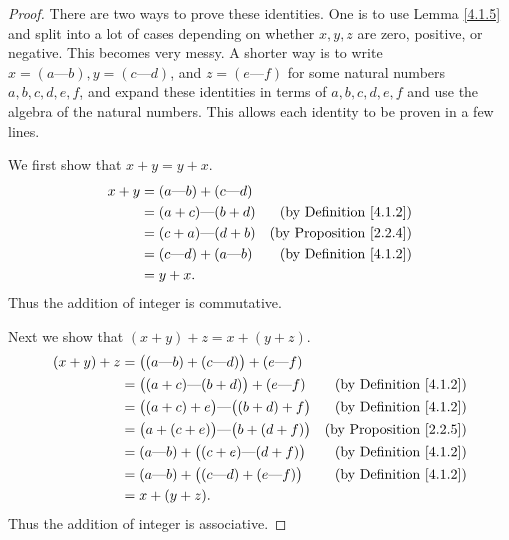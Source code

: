\begin{proof}
    There are two ways to prove these identities.
    One is to use Lemma \ref{4.1.5} and split into a lot of cases depending on whether \(x, y, z\) are zero, positive, or negative.
    This becomes very messy.
    A shorter way is to write \(x = (a \text{---} b), y = (c \text{---} d)\), and \(z = (e \text{---} f)\) for some natural numbers \(a, b, c, d, e, f\), and expand these identities in terms of \(a, b, c, d, e, f\) and use the algebra of the natural numbers.
    This allows each identity to be proven in a few lines.

    We first show that \(x + y = y + x\).
    \begin{align*}
        x + y & = (a \text{---} b) + (c \text{---} d) &                                     \\
              & = (a + c) \text{---} (b + d)          & \text{(by Definition \ref{4.1.2})}  \\
              & = (c + a) \text{---} (d + b)          & \text{(by Proposition \ref{2.2.4})} \\
              & = (c \text{---} d) + (a \text{---} b) & \text{(by Definition \ref{4.1.2})}  \\
              & = y + x.
    \end{align*}
    Thus the addition of integer is commutative.

    Next we show that \((x + y) + z = x + (y + z)\).
    \begin{align*}
        (x + y) + z & = \big((a \text{---} b) + (c \text{---} d)\big) + (e \text{---} f)                                       \\
                    & = \big((a + c) \text{---} (b + d)\big) + (e \text{---} f)          & \text{(by Definition \ref{4.1.2})}  \\
                    & = \big((a + c) + e\big) \text{---} \big((b + d) + f\big)           & \text{(by Definition \ref{4.1.2})}  \\
                    & = \big(a + (c + e)\big) \text{---} \big(b + (d + f)\big)           & \text{(by Proposition \ref{2.2.5})} \\
                    & = (a \text{---} b) + \big((c + e) \text{---} (d + f)\big)          & \text{(by Definition \ref{4.1.2})}  \\
                    & = (a \text{---} b) + \big((c \text{---} d) + (e \text{---} f)\big) & \text{(by Definition \ref{4.1.2})}  \\
                    & = x + (y + z).
    \end{align*}
    Thus the addition of integer is associative.


\end{proof}
